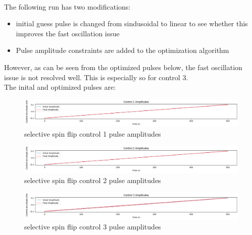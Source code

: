\documentclass{article}
\begin{document}
\\

The following run has two modifications: 
\begin{itemize}
    \item initial guess pulse is changed from sindusoidal to linear to see whether this improves the fast oscillation issue
    \item Pulse amplitude constraints are added to the optimization algorithm
\end{itemize}
However, as can be seen from the optimized pulses below, the fast oscillation issue is not resolved well. 
This is especially so for control 3.
\\

The inital and optimized pulses are: 
\begin{figure}[H]
    \centering
    \includegraphics[width=0.6\linewidth]{selective_spin_flip_GRAPE_500,_100_000_LIN_constraints_control1.png}
    \caption{selective spin flip control 1 pulse amplitudes}
    \label{fig:selective_spin_flip_constrains_control1}
\end{figure}
\begin{figure}[H]
    \centering
    \includegraphics[width=0.6\linewidth]{selective_spin_flip_GRAPE_500,_100_000_LIN_constraints_control2.png}
    \caption{selective spin flip control 2 pulse amplitudes}
    \label{fig:selective_spin_flip_constrains_control2}
\end{figure}
\begin{figure}[H]
    \centering
    \includegraphics[width=0.6\linewidth]{selective_spin_flip_GRAPE_500,_100_000_LIN_constraints_control3.png}
    \caption{selective spin flip control 3 pulse amplitudes}
    \label{fig:selective_spin_flip_constrains_control3}
\end{figure}
\end{document}
